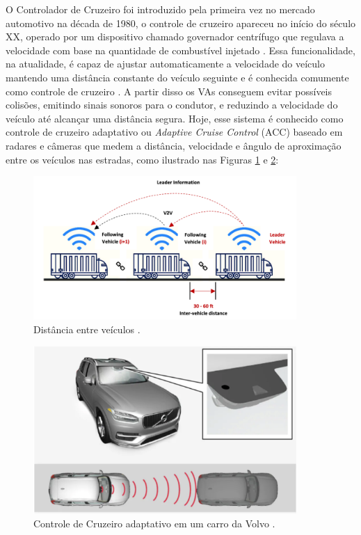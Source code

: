  \label{cruzeiroo}
O Controlador de Cruzeiro foi introduzido pela primeira vez no mercado automotivo na década de 1980, o controle de cruzeiro apareceu no início do século XX, operado por um dispositivo chamado governador centrífugo que regulava a velocidade com base na quantidade de combustível injetado \cite{caio}. Essa funcionalidade, na atualidade, é capaz de ajustar automaticamente a velocidade do veículo mantendo uma distância constante do veículo seguinte e é conhecida comumente como controle de cruzeiro \cite{sensors-yet}.
A partir disso os VAs conseguem evitar possíveis colisões, emitindo sinais sonoros para o condutor, e reduzindo a velocidade do veículo até alcançar uma distância segura. Hoje, esse sistema é conhecido como controle de cruzeiro adaptativo ou \textit{Adaptive Cruise Control} (ACC) baseado em radares e câmeras que medem a distância, velocidade e ângulo de aproximação entre os veículos nas estradas, como ilustrado nas Figuras \ref{cruzeiro} e \ref{ACC}:

\begin{figure}[H]
\centering
\includegraphics[width=10cm]{Figures/cruzeiro.png}
\caption{Distância entre veículos \cite{review-auto}.}
\label{cruzeiro}
\end{figure}


\begin{figure}[H]
\centering
\includegraphics[width=10cm]{Figures/ACC.png}
\caption{Controle de Cruzeiro adaptativo em um carro da Volvo \cite{caio}.}
\label{ACC}
\end{figure}


